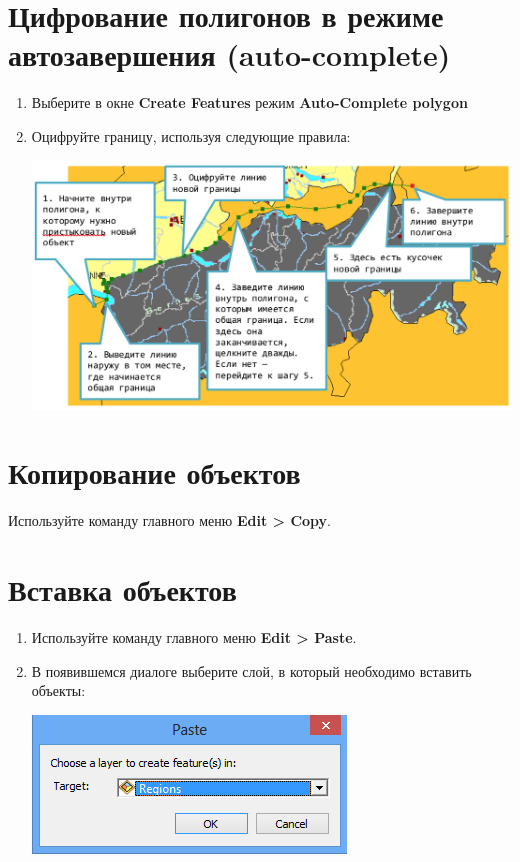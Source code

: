 \documentclass[]{book}
\theoremstyle{definition}
\theoremstyle{definition}
\theoremstyle{definition}
\theoremstyle{remark}
\begin{document}
\hypertarget{manual-edit-complete}{%
\section{Цифрование полигонов в режиме автозавершения
(auto-complete)}\label{manual-edit-complete}}

\begin{enumerate}
\def\labelenumi{\arabic{enumi}.}
\item
  Выберите в окне \textbf{Create Features} режим \textbf{Auto-Complete
  polygon}
\item
  Оцифруйте границу, используя следующие правила:

  \includegraphics{images/Appendix/image93.png}
\end{enumerate}

\hypertarget{manual-edit-copy}{%
\section{Копирование объектов}\label{manual-edit-copy}}

Используйте команду главного меню \textbf{Edit \textgreater{} Copy}.

\hypertarget{manual-edit-insert}{%
\section{Вставка объектов}\label{manual-edit-insert}}

\begin{enumerate}
\def\labelenumi{\arabic{enumi}.}
\item
  Используйте команду главного меню \textbf{Edit \textgreater{} Paste}.
\item
  В появившемся диалоге выберите слой, в который необходимо вставить
  объекты:

  \includegraphics{images/Appendix/image96.png}
\end{enumerate}
\end{document}
